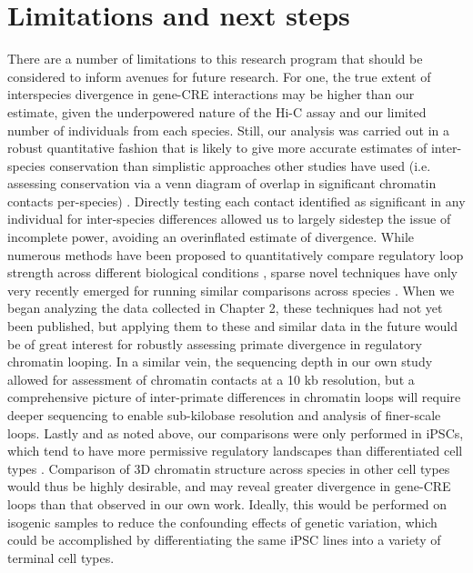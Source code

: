 \section{Limitations and next steps}
There are a number of limitations to this research program that should be considered to inform avenues for future research. For one, the true extent of interspecies divergence in gene-CRE interactions may be higher than our estimate, given the underpowered nature of the Hi-C assay \cite{Belton.2012} and our limited number of individuals from each species. Still, our analysis was carried out in a robust quantitative fashion that is likely to give more accurate estimates of inter-species conservation than simplistic approaches other studies have used (i.e. assessing conservation via a venn diagram of overlap in significant chromatin contacts per-species) \cite{Dixon.2012, Rao.2014}. Directly testing each contact identified as significant in any individual for inter-species differences allowed us to largely sidestep the issue of incomplete power, avoiding an overinflated estimate of divergence. While numerous methods have been proposed to quantitatively compare regulatory loop strength across different biological conditions \cite{Lun.2015, Paulsen.2014, Djekidel.2018, Fernandez.2020, Rao.2014}, sparse novel techniques have only very recently emerged for running similar comparisons across species \cite{Yang.2019, Nuriddinov.2019}. When we began analyzing the data collected in Chapter 2, these techniques had not yet been published, but applying them to these and similar data in the future would be of great interest for robustly assessing primate divergence in regulatory chromatin looping. In a similar vein, the sequencing depth in our own study allowed for assessment of chromatin contacts at a 10 kb resolution, but a comprehensive picture of inter-primate differences in chromatin loops will require deeper sequencing to enable sub-kilobase resolution and analysis of finer-scale loops. Lastly and as noted above, our comparisons were only performed in iPSCs, which tend to have more permissive regulatory landscapes than differentiated cell types \cite{Spivakov.2007}. Comparison of 3D chromatin structure across species in other cell types would thus be highly desirable, and may reveal greater divergence in gene-CRE loops than that observed in our own work. Ideally, this would be performed on isogenic samples to reduce the confounding effects of genetic variation, which could be accomplished by differentiating the same iPSC lines into a variety of terminal cell types.

